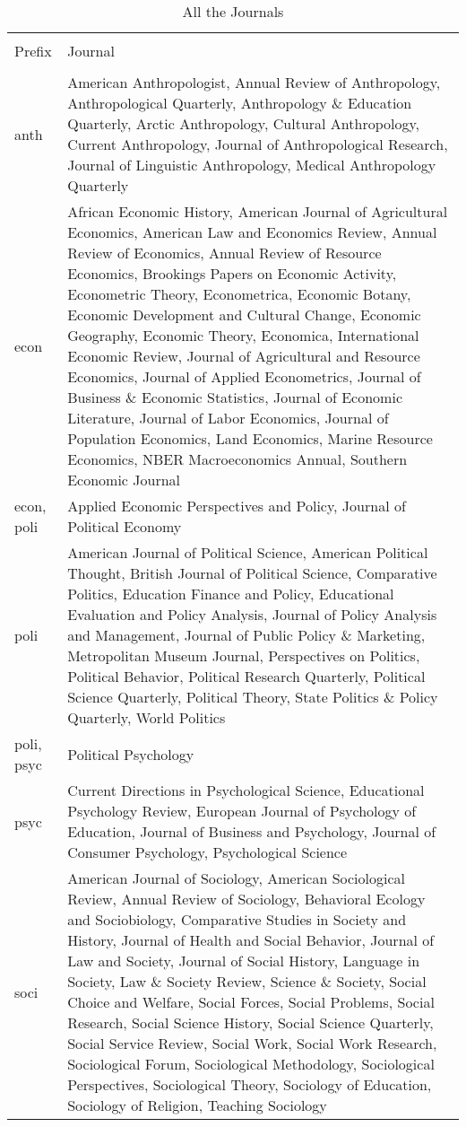 \documentclass[]{article}
\begin{document}
\begin{table}[!htbp] \centering 
  \caption{All the Journals} 
  \label{t-sframe} 
\begin{tabular}{@{\extracolsep{5pt}} p{1in}p{4in}} 
\\[-1.8ex]\hline 
\hline \\[-1.8ex] 
Prefix & Journal \\ 
\hline \\[-1.8ex] 
anth & American Anthropologist, Annual Review of Anthropology, Anthropological Quarterly, Anthropology \& Education Quarterly, Arctic Anthropology, Cultural Anthropology, Current Anthropology, Journal of Anthropological Research, Journal of Linguistic Anthropology, Medical Anthropology Quarterly \\ 
econ & African Economic History, American Journal of Agricultural Economics, American Law and Economics Review, Annual Review of Economics, Annual Review of Resource Economics, Brookings Papers on Economic Activity, Econometric Theory, Econometrica, Economic Botany, Economic Development and Cultural Change, Economic Geography, Economic Theory, Economica, International Economic Review, Journal of Agricultural and Resource Economics, Journal of Applied Econometrics, Journal of Business \& Economic Statistics, Journal of Economic Literature, Journal of Labor Economics, Journal of Population Economics, Land Economics, Marine Resource Economics, NBER Macroeconomics Annual, Southern Economic Journal \\ 
econ, poli & Applied Economic Perspectives and Policy, Journal of Political Economy \\ 
poli & American Journal of Political Science, American Political Thought, British Journal of Political Science, Comparative Politics, Education Finance and Policy, Educational Evaluation and Policy Analysis, Journal of Policy Analysis and Management, Journal of Public Policy \& Marketing, Metropolitan Museum Journal, Perspectives on Politics, Political Behavior, Political Research Quarterly, Political Science Quarterly, Political Theory, State Politics \& Policy Quarterly, World Politics \\ 
poli, psyc & Political Psychology \\ 
psyc & Current Directions in Psychological Science, Educational Psychology Review, European Journal of Psychology of Education, Journal of Business and Psychology, Journal of Consumer Psychology, Psychological Science \\ 
soci & American Journal of Sociology, American Sociological Review, Annual Review of Sociology, Behavioral Ecology and Sociobiology, Comparative Studies in Society and History, Journal of Health and Social Behavior, Journal of Law and Society, Journal of Social History, Language in Society, Law \& Society Review, Science \& Society, Social Choice and Welfare, Social Forces, Social Problems, Social Research, Social Science History, Social Science Quarterly, Social Service Review, Social Work, Social Work Research, Sociological Forum, Sociological Methodology, Sociological Perspectives, Sociological Theory, Sociology of Education, Sociology of Religion, Teaching Sociology \\ 

\end{tabular}
\end{table}
\end{document}
